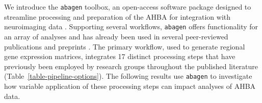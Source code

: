 \documentclass[12pt,aps,pra,reprint,showkeys]{revtex4-1}
\begin{document}
We introduce the \texttt{abagen} toolbox, an open-access software package designed to streamline processing and preparation of the AHBA for integration with neuroimaging data \citep[][available at \url{https://github.com/rmarkello/abagen}]{abagen}.
Supporting several workflows, \texttt{abagen} offers functionality for an array of analyses and has already been used in several peer-reviewed publications and preprints \citep{shafiei2020elife, hansen2021nathumbeh, shafieibazinet2021biorxiv, brown2021biorxiv, park2021elife, valk2021biorxiv, zhao2020biorxiv, benkarim2020biorxiv, ding2021cercor, park2020biorxiv, lariviere2020biorxiv, martins2021biorxiv}.
The primary workflow, used to generate regional gene expression matrices, integrates 17 distinct processing steps that have previously been employed by research groups throughout the published literature (Table~\ref{table-pipeline-options}).
The following results use \texttt{abagen} to investigate how variable application of these processing steps can impact analyses of AHBA data.
\end{document}
